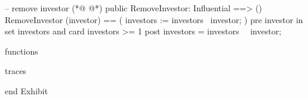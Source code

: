 \begin{vdmpp}[breaklines=true]
 -- remove investor
(*@
\label{RemoveInvestor:81}
@*)
 public RemoveInvestor: Influential ==> ()
   RemoveInvestor (investor) == (
    investors := investors \ {investor};
   )
   pre investor in set investors and card investors >= 1
  post investors = investors~ \ {investor};    
    
functions

traces

end Exhibit
\end{vdmpp}
